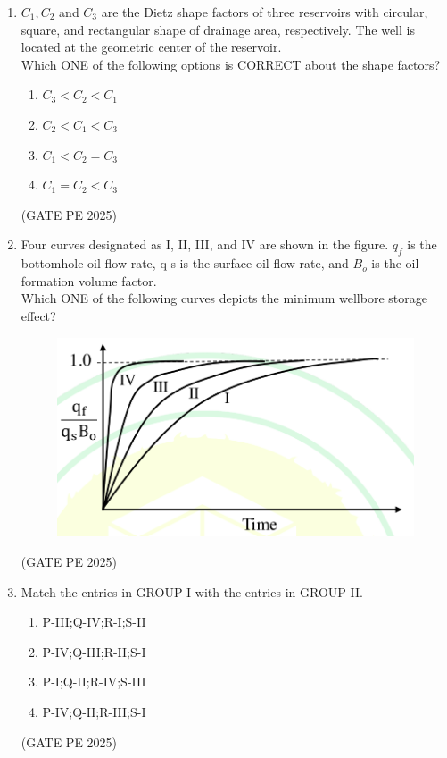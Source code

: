 \documentclass[journal,12pt,onecolumn]{IEEEtran}
\theoremstyle{remark}
\begin{document}
\begin{enumerate}
\item $C_1, C_2$ and $C_3$ are the Dietz shape factors of three reservoirs with circular, square, and rectangular shape of drainage area, respectively. The well is located at the geometric center of the reservoir.\\
Which ONE of the following options is CORRECT about the shape factors?
\begin{enumerate}
    \item $C_3<C_2<C_1$
    \item $C_2<C_1<C_3$
    \item $C_1<C_2=C_3$
    \item $C_1=C_2<C_3$
\end{enumerate}
\hfill{(GATE PE 2025)}

\item Four curves designated as I, II, III, and IV are shown in the figure. $q_f$ is the bottomhole oil flow rate, q s is the surface oil flow rate, and $B_o$ is the oil formation volume factor.\\
Which ONE of the following curves depicts the minimum wellbore storage effect?
\begin{figure}[H]
    \centering
    \includegraphics[width=0.4\columnwidth]{25Q19.png}
    \caption{}
    \label{fig:placeholder}
\end{figure}
\begin{enumerate}
\end{enumerate}
\hfill{(GATE PE 2025)}

\item Match the entries in GROUP I with the entries in GROUP II.\\


\begin{enumerate}
    \item P-III;Q-IV;R-I;S-II
    \item P-IV;Q-III;R-II;S-I
    \item P-I;Q-II;R-IV;S-III
    \item P-IV;Q-II;R-III;S-I
\end{enumerate}
\hfill{(GATE PE 2025)}


\end{enumerate}
\end{document}

